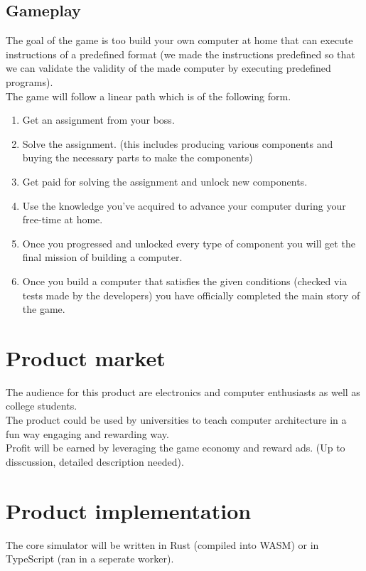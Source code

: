 \documentclass[12pt]{article}
\begin{document}
\subsection{Gameplay}
The goal of the game is too build your own computer at home that can execute instructions of a predefined format (we made the instructions 
predefined so that we can validate the validity of the made computer by executing predefined programs).\\
The game will follow a linear path which is of the following form.\\
\begin{enumerate}
    \item Get an assignment from your boss.
    \item Solve the assignment. (this includes producing various components and buying the necessary parts to make the components)
    \item Get paid for solving the assignment and unlock new components.
    \item Use the knowledge you've acquired to advance your computer during your free-time at home.
    \item Once you progressed and unlocked every type of component you will get the final mission of building a computer.
    \item Once you build a computer that satisfies the given conditions (checked via tests made by the developers) you have officially completed the main story of the game.
\end{enumerate}

\section{Product market}
The audience for this product are electronics and computer enthusiasts as well as college students.\\
The product could be used by universities to teach computer architecture in a fun way engaging and rewarding way.\\
Profit will be earned by leveraging the game economy and reward ads. (Up to disscussion, detailed description needed).\\
\section{Product implementation}
The core simulator will be written in Rust (compiled into WASM) or in TypeScript (ran in a seperate worker).
\end{document}

